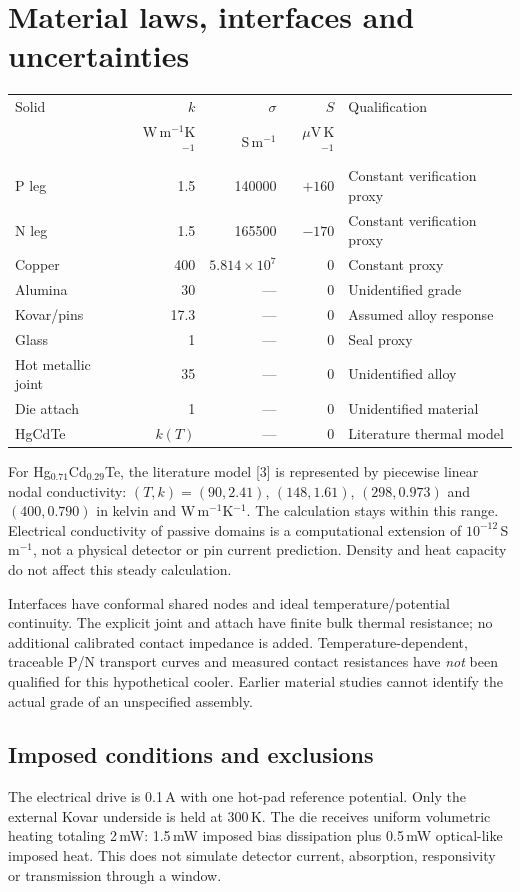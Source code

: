 \documentclass[11pt,a4paper]{article}
\begin{document}
\section{Material laws, interfaces and uncertainties}
\begin{tabularx}{\linewidth}{lrrrX}\toprule
Solid & $k$ & $\sigma$ & $S$ & Qualification\\
 & W\,m$^{-1}$K$^{-1}$ & S\,m$^{-1}$ & $\mu$V\,K$^{-1}$ & \\\midrule
P leg & 1.5 & 140000 & $+160$ & Constant verification proxy\\
N leg & 1.5 & 165500 & $-170$ & Constant verification proxy\\
Copper & 400 & $5.814\times10^7$ & 0 & Constant proxy\\
Alumina & 30 & --- & 0 & Unidentified grade\\
Kovar/pins & 17.3 & --- & 0 & Assumed alloy response\\
Glass & 1 & --- & 0 & Seal proxy\\
Hot metallic joint & 35 & --- & 0 & Unidentified alloy\\
Die attach & 1 & --- & 0 & Unidentified material\\
HgCdTe & $k(T)$ & --- & 0 & Literature thermal model\\\bottomrule
\end{tabularx}

For Hg$_{0.71}$Cd$_{0.29}$Te, the literature model [3] is represented by piecewise linear nodal conductivity: $(T,k)=(90,2.41)$, $(148,1.61)$, $(298,0.973)$ and $(400,0.790)$ in kelvin and W\,m$^{-1}$K$^{-1}$. The calculation stays within this range. Electrical conductivity of passive domains is a computational extension of $10^{-12}$\,S\,m$^{-1}$, not a physical detector or pin current prediction. Density and heat capacity do not affect this steady calculation.

Interfaces have conformal shared nodes and ideal temperature/potential continuity. The explicit joint and attach have finite bulk thermal resistance; no additional calibrated contact impedance is added. Temperature-dependent, traceable P/N transport curves and measured contact resistances have \emph{not} been qualified for this hypothetical cooler. Earlier material studies cannot identify the actual grade of an unspecified assembly.

\subsection{Imposed conditions and exclusions}
The electrical drive is 0.1\,A with one hot-pad reference potential. Only the external Kovar underside is held at 300\,K. The die receives uniform volumetric heating totaling 2\,mW: 1.5\,mW imposed bias dissipation plus 0.5\,mW optical-like imposed heat. This does not simulate detector current, absorption, responsivity or transmission through a window.
\end{document}
